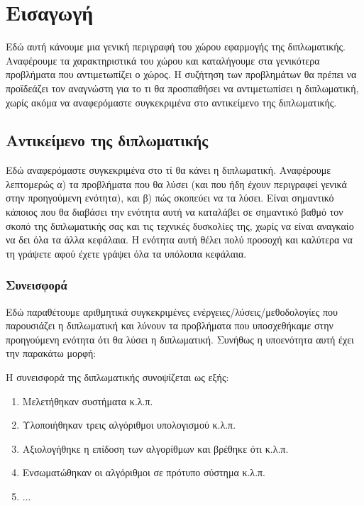 \chapter{Εισαγωγή}
\label{chap1}

Εδώ αυτή κάνουμε μια γενική περιγραφή του χώρου εφαρμογής της διπλωματικής. Αναφέρουμε τα χαρακτηριστικά του χώρου και καταλήγουμε στα γενικότερα προβλήματα που αντιμετωπίζει ο χώρος. Η συζήτηση των προβλημάτων θα πρέπει να προϊδεάζει τον αναγνώστη για το τι θα προσπαθήσει να αντιμετωπίσει η διπλωματική, χωρίς ακόμα να αναφερόμαστε συγκεκριμένα στο αντικείμενο της διπλωματικής.
  


\section{Αντικείμενο της διπλωματικής}

Εδώ αναφερόμαστε συγκεκριμένα στο τί θα κάνει η διπλωματική. Αναφέρουμε λεπτομερώς α) τα προβλήματα που θα λύσει (και που ήδη έχουν περιγραφεί γενικά στην προηγούμενη ενότητα), και β) πώς σκοπεύει να τα λύσει. 
Είναι σημαντικό κάποιος που θα διαβάσει την ενότητα αυτή να καταλάβει σε σημαντικό βαθμό τον σκοπό της διπλωματικής σας και τις τεχνικές δυσκολίες της, χωρίς να είναι αναγκαίο να δει όλα τα άλλα κεφάλαια. Η ενότητα αυτή θέλει πολύ προσοχή και καλύτερα να τη γράψετε αφού έχετε γράψει όλα τα υπόλοιπα κεφάλαια.

\subsection{Συνεισφορά}
Εδώ παραθέτουμε αριθμητικά συγκεκριμένες ενέργειες/λύσεις/μεθοδολογίες που παρουσιάζει η διπλωματική και λύνουν τα προβλήματα που υποσχεθήκαμε στην προηγούμενη ενότητα ότι θα λύσει η διπλωματική. Συνήθως η υποενότητα αυτή έχει την παρακάτω μορφή:

Η συνεισφορά της διπλωματικής συνοψίζεται ως εξής:
\begin{enumerate}
\item Μελετήθηκαν συστήματα κ.λ.π.
\item Υλοποιήθηκαν τρεις αλγόριθμοι υπολογισμού κ.λ.π.
\item Αξιολογήθηκε η επίδοση των αλγορίθμων και βρέθηκε ότι κ.λ.π.
\item Ενσωματώθηκαν οι αλγόριθμοι σε πρότυπο σύστημα κ.λ.π.
\item ...
\end{enumerate}


